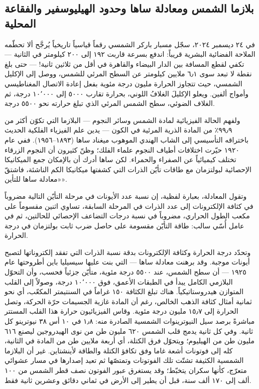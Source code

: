 \documentclass[12pt,a4paper,openany]{book}
\begin{document}


\subsection*{بلازما الشمس ومعادلة ساها وحدود الهيليوسفير والفقاعة المحلية}

في ٢٤ ديسمبر ٢٠٢٤، سجّل مسبار باركر الشمسي رقماً قياسياً تاريخياً يُرجَّح ألا تحطّمه الملاحة الفضائية البشرية قريباً: اندفع بسرعة قاربت ١٩٢ إلى ٢٠٠ كيلومتر في الثانية — تكفي لقطع المسافة بين الدار البيضاء والقاهرة في أقل من ثلاثين ثانية! — حتى بلغ نقطة لا تبعد سوى ٦٫١ ملايين كيلومتر عن السطح المرئي للشمس، ووصل إلى الإكليل الشمسي، حيث تتجاوز الحرارة مليون درجة مئوية بفعل إعادة الاتصال المغناطيسي وأمواج ألفين. ويعلو الإكليلَ الغلافُ اللوني، بحرارة تقارب ٥٠٠٠ إلى ١٠٬٠٠٠ درجة، ثم الغلاف الضوئي، سطح الشمس المرئي الذي تبلغ حرارته نحو ٥٥٠٠ درجة.


ولفهم الحالة الفيزيائية لمادة الشمس وسائر النجوم — البلازما التي تكوّن أكثر من ٩٩٫٩٪ من المادة الذرية المرئية في الكون — يدين علم الفيزياء الفلكية الحديث باختراقه التأسيسي إلى الشاب الهندي الموهوب ميغناد ساها (١٨٩٣–١٩٥٦). ففي عام ١٩٢٠ حيّرت اختلافات أطياف النجوم علماء الفلك؛ وظنّ كثيرون أن النجوم الزرقاء تختلف كيميائياً عن الصفراء والحمراء. لكن ساها أدرك أن بالإمكان جمع الميكانيكا الإحصائية لبولتزمان مع طاقات تأيّن الذرات التي كشفتها ميكانيكا الكم الناشئة، فاشتقّ «معادلة ساها للتأين».


وتقول المعادلة، بعبارة لفظية، إن نسبة عدد الأيونات في مرحلة التأيّن التالية مضروباً في كثافة الإلكترونات إلى عدد الذرات في المرحلة السابقة، تساوي اثنين مقسوماً على مكعب الطول الحراري، مضروباً في نسبة درجات التضاعف الإحصائي للحالتين، ثم في عامل أُسّي سالب: طاقة التأيّن مقسومة على حاصل ضرب ثابت بولتزمان في درجة الحرارة.


وتحدّد درجة الحرارة وكثافة الإلكترونات بدقة نسبة الذرات التي تفقد إلكتروناتها لتصبح أيونات موجبة. وقد برهنت معادلة ساها — التي بنت عليها سيسيليا باين أطروحتها عام ١٩٢٥ — أن سطح الشمس، عند ٥٥٠٠ درجة مئوية، متأيّن جزئياً فحسب، وأن التحوّل البلازمي الكامل يبدأ في الطبقات الأعمق، فوق ١٠٬٠٠٠ درجة، وصولاً إلى القلب المتوازن هيدروستاتيكياً. هناك تبلغ الكثافة ١٥٠ غراماً في السنتيمتر المكعّب، أي نحو ثمانية أمثال كثافة الذهب الخالص، رغم أن المادة غازية الجسيمات حرّة الحركة، وتصل الحرارة إلى ١٥٫٧ مليون درجة مئوية. وقاس الفيزيائيون حرارة هذا القلب المستتر مباشرةً برصد سيل النيوترينوات الشمسية الصادرة منه: ١٫٨ في ١٠ أس ٣٨ نيوترينو كل ثانية. وفي كل ثانية يدمج قلب الشمس ٦٢٠ مليون طن من نوى الهيدروجين ليصنع ٦١٦ مليون طن من الهيليوم؛ ويتحوّل فرق الكتلة، أي أربعة ملايين طن من المادة في الثانية، كله إلى فوتونات أشعة غاما وفق تكافؤ الكتلة والطاقة لأينشتاين. غير أن البلازما الشمسية الكثيفة تشتّت تلك الفوتونات وتمتصّها ثم تعيد إصدارها في مسار عشوائي متعرّج، كأنها سكران يتخبّط؛ وقد يستغرق عبور الفوتون نصف قطر الشمس من ١٠٠ ألف إلى ١٧٠ ألف سنة، قبل أن يطير إلى الأرض في ثماني دقائق وعشرين ثانية فقط.
\end{document}
